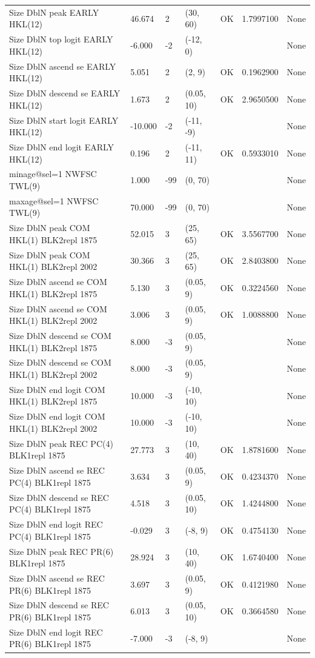 \documentclass[
  english,
  a4paper,
]{article}
\begin{document}
\begin{landscape}
\begin{longtable}[t]{lllllll}
Size DblN peak EARLY HKL(12) & 46.674 & 2 & (30, 60) & OK & 1.7997100 & None\\
Size DblN top logit EARLY HKL(12) & -6.000 & -2 & (-12, 0) &  &  & None\\
Size DblN ascend se EARLY HKL(12) & 5.051 & 2 & (2, 9) & OK & 0.1962900 & None\\
Size DblN descend se EARLY HKL(12) & 1.673 & 2 & (0.05, 10) & OK & 2.9650500 & None\\
\addlinespace
Size DblN start logit EARLY HKL(12) & -10.000 & -2 & (-11, -9) &  &  & None\\
Size DblN end logit EARLY HKL(12) & 0.196 & 2 & (-11, 11) & OK & 0.5933010 & None\\
minage@sel=1 NWFSC TWL(9) & 1.000 & -99 & (0, 70) &  &  & None\\
maxage@sel=1 NWFSC TWL(9) & 70.000 & -99 & (0, 70) &  &  & None\\
Size DblN peak COM HKL(1) BLK2repl 1875 & 52.015 & 3 & (25, 65) & OK & 3.5567700 & None\\
\addlinespace
Size DblN peak COM HKL(1) BLK2repl 2002 & 30.366 & 3 & (25, 65) & OK & 2.8403800 & None\\
Size DblN ascend se COM HKL(1) BLK2repl 1875 & 5.130 & 3 & (0.05, 9) & OK & 0.3224560 & None\\
Size DblN ascend se COM HKL(1) BLK2repl 2002 & 3.006 & 3 & (0.05, 9) & OK & 1.0088800 & None\\
Size DblN descend se COM HKL(1) BLK2repl 1875 & 8.000 & -3 & (0.05, 9) &  &  & None\\
Size DblN descend se COM HKL(1) BLK2repl 2002 & 8.000 & -3 & (0.05, 9) &  &  & None\\
\addlinespace
Size DblN end logit COM HKL(1) BLK2repl 1875 & 10.000 & -3 & (-10, 10) &  &  & None\\
Size DblN end logit COM HKL(1) BLK2repl 2002 & 10.000 & -3 & (-10, 10) &  &  & None\\
Size DblN peak REC PC(4) BLK1repl 1875 & 27.773 & 3 & (10, 40) & OK & 1.8781600 & None\\
Size DblN ascend se REC PC(4) BLK1repl 1875 & 3.634 & 3 & (0.05, 9) & OK & 0.4234370 & None\\
Size DblN descend se REC PC(4) BLK1repl 1875 & 4.518 & 3 & (0.05, 10) & OK & 1.4244800 & None\\
\addlinespace
Size DblN end logit REC PC(4) BLK1repl 1875 & -0.029 & 3 & (-8, 9) & OK & 0.4754130 & None\\
Size DblN peak REC PR(6) BLK1repl 1875 & 28.924 & 3 & (10, 40) & OK & 1.6740400 & None\\
Size DblN ascend se REC PR(6) BLK1repl 1875 & 3.697 & 3 & (0.05, 9) & OK & 0.4121980 & None\\
Size DblN descend se REC PR(6) BLK1repl 1875 & 6.013 & 3 & (0.05, 10) & OK & 0.3664580 & None\\
Size DblN end logit REC PR(6) BLK1repl 1875 & -7.000 & -3 & (-8, 9) &  &  & None\\*
\end{longtable}
\endgroup{}
\end{landscape}
\end{document}
